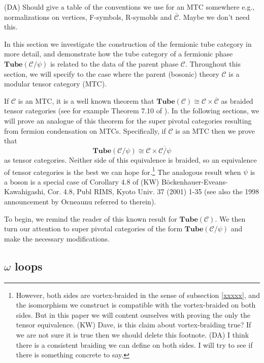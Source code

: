 \documentclass[12pt,a4paper]{article}
\newcommand{\mcc}{\mathcal{C}}
\newcommand\be            {\begin{equation}}
\newcommand\ee            {\end{equation}}
\newcommand{\tube}{\textbf{Tube}}
\newcommand{\kw}[1]{{\color{kwcolor}\footnotesize{(KW) #1}}}
\newcommand{\dave}[1]{{\color{ao(english)}\footnotesize{(DA) #1}}}
\begin{document}
\dave{Should give a table of the conventions we use for an MTC somewhere
e.g., normalizations on vertices, F-symbols, R-symobls and $\bar{\mcc}$.
Maybe we don't need this.}

In this section we investigate the construction of the fermionic tube category in more detail, 
and demonstrate how the tube category of a fermionic phase $\tube(\mcc / \psi)$ is related to 
the data of the parent phase $\mcc$. 
Throughout this section, we will specify to the case where the parent (bosonic) theory $\mcc$
is a modular tensor category (MTC).

If $\mcc$ is an MTC, it is a well known theorem that $\tube(\mcc) \cong \mcc \times \overline{\mcc}$ as braided tensor categories
(see for example Theorem 7.10 of \cite{muger2003b}). 
In the following sections, we will prove an analogue of this theorem for the super pivotal categories resulting from fermion condensation on MTCs.
Specifically, if $\mcc$ is an MTC then we prove that 
\be \label{tube_theorem_teaser}
	\tube(\mcc/\psi) \cong \mcc \times \overline{\mcc/\psi}
\ee 
as tensor categories.
Neither side of this equivalence is braided, so an equivalence of tensor categories is the best we can hope for.\footnote{However, 
both sides are vortex-braided in the sense of subsection \ref{xxxxx}, and the isomorphism we construct
is compatible with the vortex-braided on both sides.
But in this paper we will content ourselves with proving the only the tensor equivalence.
\kw{Dave, is this claim about vortex-braiding true?
If we are not sure it is true then we should delete this footnote.}
\dave{I think there is a consistent braiding we can define on both sides.
I will try to see if there is something concrete to say.}
}
The analogous result when $\psi$ is a boson is a special case of Corollary 4.8 of \cite{kawahigashi2001}
\kw{B\"ockenhauer-Eveans-Kawahigashi, Cor. 4.8, Publ RIMS, Kyoto Univ. 37 (2001) 1-35}
(see also the 1998 announcement by Ocneaunu referred to therein).

To begin, we remind the reader of this known result for $\tube(\mcc)$.
We then turn our attention to super pivotal categories of the form $\tube(\mcc/\psi)$ and make the necessary modifications.

\subsection{$\omega$ loops}
\end{document}
